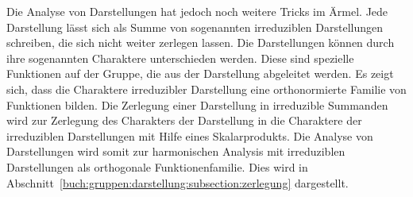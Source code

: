 Die Analyse von Darstellungen hat jedoch noch weitere Tricks im Ärmel.
Jede Darstellung lässt sich als Summe von sogenannten irreduziblen
Darstellungen schreiben, die sich nicht weiter zerlegen lassen.
Die Darstellungen können durch ihre sogenannten Charaktere unterschieden
werden.
Diese sind spezielle Funktionen auf der Gruppe, die aus der Darstellung
abgeleitet werden.
Es zeigt sich, dass die Charaktere irreduzibler Darstellung eine 
orthonormierte Familie von Funktionen bilden.
Die Zerlegung einer Darstellung in irreduzible Summanden wird
zur Zerlegung des Charakters der Darstellung in die
Charaktere der irreduziblen Darstellungen mit Hilfe eines Skalarprodukts.
Die Analyse von Darstellungen wird somit zur harmonischen Analysis
mit irreduziblen Darstellungen als orthogonale Funktionenfamilie.
Dies wird in Abschnitt~\ref{buch:gruppen:darstellung:subsection:zerlegung}
dargestellt.










\uebungsabschnitt
{}

\begin{uebungsaufgaben}
\end{uebungsaufgaben}
\enduebungsabschnitt


